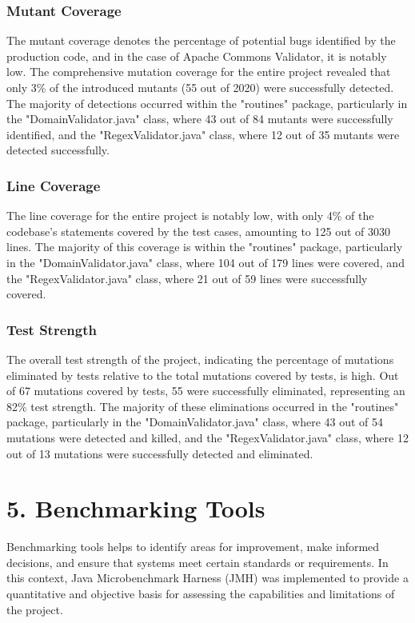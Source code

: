 \documentclass{sigchi}
\begin{document}
\subsubsection{\textbf{Mutant Coverage}}
The mutant coverage denotes the percentage of potential bugs identified by the production code, and in the case of Apache Commons Validator, it is notably low. The comprehensive mutation coverage for the entire project revealed that only 3\% of the introduced mutants (55 out of 2020) were successfully detected. The majority of detections occurred within the "routines" package, particularly in the "DomainValidator.java" class, where 43 out of 84 mutants were successfully identified, and the "RegexValidator.java" class, where 12 out of 35 mutants were detected successfully.

\subsubsection{\textbf{Line Coverage}}
The line coverage for the entire project is notably low, with only 4\% of the codebase's statements covered by the test cases, amounting to 125 out of 3030 lines. The majority of this coverage is within the "routines" package, particularly in the "DomainValidator.java" class, where 104 out of 179 lines were covered, and the "RegexValidator.java" class, where 21 out of 59 lines were successfully covered.

\subsubsection{\textbf{Test Strength}}
The overall test strength of the project, indicating the percentage of mutations eliminated by tests relative to the total mutations covered by tests, is high. Out of 67 mutations covered by tests, 55 were successfully eliminated, representing an 82\% test strength. The majority of these eliminations occurred in the "routines" package, particularly in the "DomainValidator.java" class, where 43 out of 54 mutations were detected and killed, and the "RegexValidator.java" class, where 12 out of 13 mutations were successfully detected and eliminated.

\section{5. Benchmarking Tools}
Benchmarking tools helps to identify areas for improvement, make informed decisions, and ensure that systems meet certain standards or requirements. In this context, Java Microbenchmark Harness (JMH) was implemented to provide a quantitative and objective basis for assessing the capabilities and limitations of the project.
\end{document}
